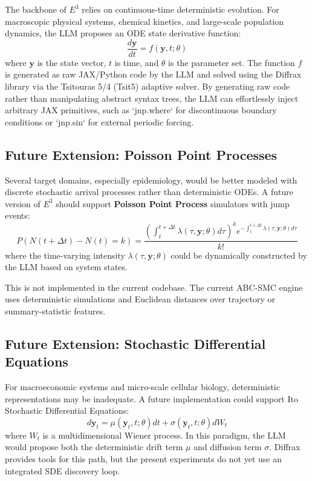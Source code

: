 The backbone of $E^3$ relies on continuous-time deterministic evolution. For macroscopic physical systems, chemical kinetics, and large-scale population dynamics, the LLM proposes an ODE state derivative function:
\begin{equation}
    \frac{d\mathbf{y}}{dt} = f(\mathbf{y}, t; \theta)
\end{equation}
where $\mathbf{y}$ is the state vector, $t$ is time, and $\theta$ is the parameter set. The function $f$ is generated as raw JAX/Python code by the LLM and solved using the Diffrax library via the Tsitouras 5/4 (Tsit5) adaptive solver. By generating raw code rather than manipulating abstract syntax trees, the LLM can effortlessly inject arbitrary JAX primitives, such as `jnp.where` for discontinuous boundary conditions or `jnp.sin` for external periodic forcing.

\subsection{Future Extension: Poisson Point Processes}
Several target domains, especially epidemiology, would be better modeled with discrete stochastic arrival processes rather than deterministic ODEs. A future version of $E^3$ should support \textbf{Poisson Point Process} simulators with jump events:
\begin{equation}
    P(N(t + \Delta t) - N(t) = k) = \frac{(\int_t^{t+\Delta t} \lambda(\tau, \mathbf{y}; \theta) d\tau)^k e^{-\int_t^{t+\Delta t} \lambda(\tau, \mathbf{y}; \theta) d\tau}}{k!}
\end{equation}
where the time-varying intensity $\lambda(\tau, \mathbf{y}; \theta)$ could be dynamically constructed by the LLM based on system states.

This is not implemented in the current codebase. The current ABC-SMC engine uses deterministic simulations and Euclidean distances over trajectory or summary-statistic features.

\subsection{Future Extension: Stochastic Differential Equations}
For macroeconomic systems and micro-scale cellular biology, deterministic representations may be inadequate. A future implementation could support Ito Stochastic Differential Equations:
\begin{equation}
    d\mathbf{y}_t = \mu(\mathbf{y}_t, t; \theta)dt + \sigma(\mathbf{y}_t, t; \theta)dW_t
\end{equation}
where $W_t$ is a multidimensional Wiener process. In this paradigm, the LLM would propose both the deterministic drift term $\mu$ and diffusion term $\sigma$. Diffrax provides tools for this path, but the present experiments do not yet use an integrated SDE discovery loop.

